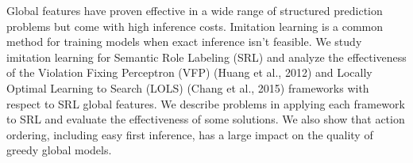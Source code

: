 Global features have proven effective in a wide range of structured prediction problems but come with high inference costs. Imitation learning is a common method for training models when exact inference isn't feasible. We study imitation learning for Semantic Role Labeling (SRL) and analyze the effectiveness of the Violation Fixing Perceptron (VFP) (Huang et al., 2012) and Locally Optimal Learning to Search (LOLS) (Chang et al., 2015) frameworks with respect to SRL global features. We describe problems in applying each framework to SRL and evaluate the effectiveness of some solutions. We also show that action ordering, including easy first inference, has a large impact on the quality of greedy global models.
